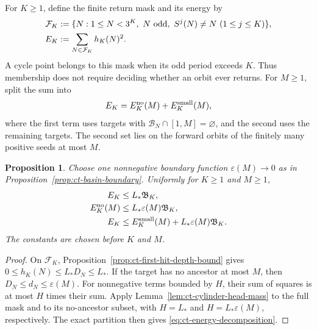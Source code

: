 \documentclass[11pt,a4paper]{article}
\newtheorem{proposition}[theorem]{Proposition}
\begin{document}
For \(K\ge1\), define the finite return mask and its energy by
\begin{align}
 \mathcal F_K&:=\{N:1\le N<3^K,\ N\ {\rm odd},\
                  S^j(N)\ne N\ (1\le j\le K)\},
                 \label{eq:ct-finite-return-mask}\\
 E_K&:=\sum_{N\in\mathcal F_K}h_K(N)^2.
                 \label{eq:ct-masked-energy}
\end{align}
A cycle point belongs to this mask when its odd period exceeds
\(K\). Thus membership does not require deciding whether an
orbit ever returns. For \(M\ge1\), split the sum into
\[
 E_K=E_K^{\rm no}(M)+E_K^{\rm small}(M),
\]
where the first term uses targets with
\(\mathcal B_N\cap[1,M]=\varnothing\), and the second uses the
remaining targets. The second set lies on the forward orbits
of the finitely many positive seeds at most \(M\).

\begin{proposition}\label{prop:ct-masked-energy-cut}
Choose one nonnegative boundary function \(\varepsilon(M)\to0\)
as in Proposition~\ref{prop:ct-basin-boundary}. Uniformly for
\(K\ge1\) and \(M\ge1\),
\begin{align}
 E_K&\le L_*\mathfrak B_K,\label{eq:ct-masked-energy-linear}\\
 E_K^{\rm no}(M)&\le L_*\varepsilon(M)\mathfrak B_K,
                    \label{eq:ct-no-ancestor-energy}\\
 E_K&\le E_K^{\rm small}(M)+L_*\varepsilon(M)\mathfrak B_K.
                    \label{eq:ct-energy-decomposition}
\end{align}
The constants are chosen before \(K\) and \(M\).
\end{proposition}
\begin{proof}
On \(\mathcal F_K\), Proposition~\ref{prop:ct-first-hit-depth-bound}
gives \(0\le h_K(N)\le L_*D_N\le L_*\).
If the target has no ancestor at most \(M\), then
\(D_N\le d_N\le\varepsilon(M)\).
For nonnegative terms bounded by \(H\), their sum of squares
is at most \(H\) times their sum. Apply
Lemma~\ref{lem:ct-cylinder-head-mass} to the full mask and to
its no-ancestor subset, with \(H=L_*\) and
\(H=L_*\varepsilon(M)\), respectively. The exact partition
then gives \eqref{eq:ct-energy-decomposition}.
\end{proof}
\end{document}
